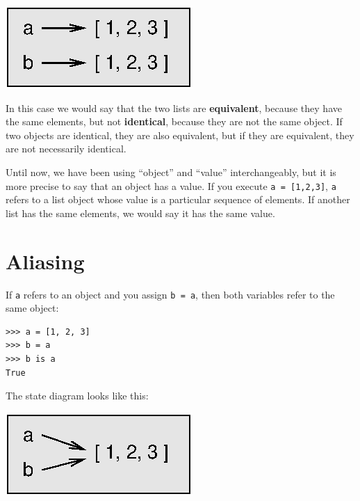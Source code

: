 \documentclass[10pt]{book}
\begin{document}

\beforefig
\centerline{\includegraphics{figs/list2.eps}}
\afterfig

In this case we would say that the two lists are {\bf equivalent},
because they have the same elements, but not {\bf identical}, because
they are not the same object.  If two objects are identical, they are
also equivalent, but if they are equivalent, they are not necessarily
identical.


Until now, we have been using ``object'' and ``value''
interchangeably, but it is more precise to say that an object has a
value.  If you execute {\tt a = [1,2,3]}, {\tt a} refers to a list
object whose value is a particular sequence of elements.  If another
list has the same elements, we would say it has the same value.



\section{Aliasing}


If {\tt a} refers to an object and you assign {\tt b = a},
then both variables refer to the same object:

\beforeverb
\begin{verbatim}
>>> a = [1, 2, 3]
>>> b = a
>>> b is a
True
\end{verbatim}
\afterverb
%
The state diagram looks like this:


\beforefig
\centerline{\includegraphics{figs/list3.eps}}
\afterfig
\end{document}
